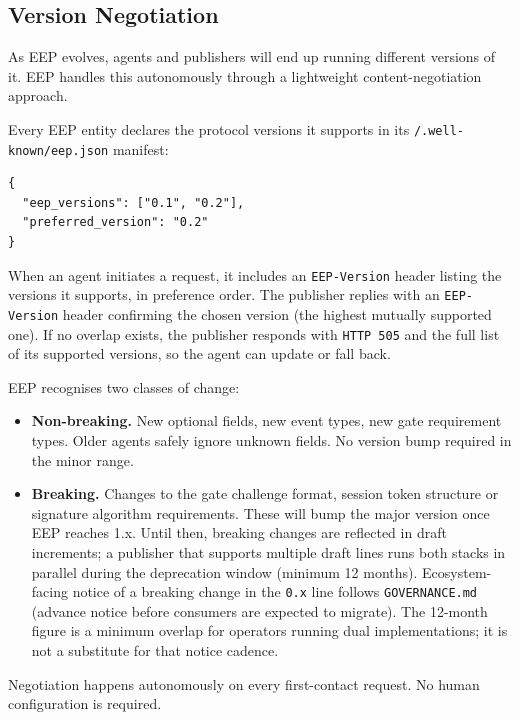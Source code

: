 \documentclass[12pt,a4paper]{article}
\begin{document}
\subsection{Version Negotiation}

As EEP evolves, agents and publishers will end up running different versions of it. EEP handles this autonomously through a lightweight content-negotiation approach.

Every EEP entity declares the protocol versions it supports in its \texttt{/.well-known/eep.json} manifest:

\begin{lstlisting}[language=EEPJson,style=eepcode]
{
  "eep_versions": ["0.1", "0.2"],
  "preferred_version": "0.2"
}
\end{lstlisting}

When an agent initiates a request, it includes an \texttt{EEP-Version} header listing the versions it supports, in preference order. The publisher replies with an \texttt{EEP-Version} header confirming the chosen version (the highest mutually supported one). If no overlap exists, the publisher responds with \texttt{HTTP 505} and the full list of its supported versions, so the agent can update or fall back.

EEP recognises two classes of change:
\begin{itemize}
    \item \textbf{Non-breaking.} New optional fields, new event types, new gate requirement types. Older agents safely ignore unknown fields. No version bump required in the minor range.
    \item \textbf{Breaking.} Changes to the gate challenge format, session token structure or signature algorithm requirements. These will bump the major version once EEP reaches 1.x. Until then, breaking changes are reflected in draft increments; a publisher that supports multiple draft lines runs both stacks in parallel during the deprecation window (minimum 12 months). Ecosystem-facing notice of a breaking change in the \texttt{0.x} line follows \texttt{GOVERNANCE.md} (advance notice before consumers are expected to migrate). The 12-month figure is a minimum overlap for operators running dual implementations; it is not a substitute for that notice cadence.
\end{itemize}

Negotiation happens autonomously on every first-contact request. No human configuration is required.

\end{document}
